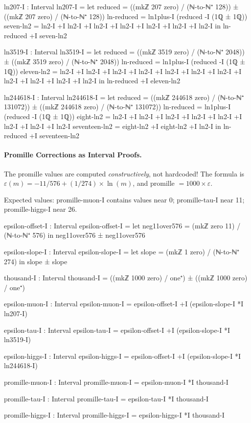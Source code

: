 \documentclass[11pt,a4paper]{book}
\def\texttt#1{#1}%
\begin{document}
\begin{code}
ln207-I : Interval
ln207-I = 
  let reduced = ((mkℤ 207 zero) / (ℕ-to-ℕ⁺ 128)) ± ((mkℤ 207 zero) / (ℕ-to-ℕ⁺ 128))
      ln-reduced = ln1plus-I (reduced -I (1ℚ ± 1ℚ))
      seven-ln2 = ln2-I +I ln2-I +I ln2-I +I ln2-I +I ln2-I +I ln2-I +I ln2-I
  in ln-reduced +I seven-ln2

ln3519-I : Interval
ln3519-I = 
  let reduced = ((mkℤ 3519 zero) / (ℕ-to-ℕ⁺ 2048)) ± ((mkℤ 3519 zero) / (ℕ-to-ℕ⁺ 2048))
      ln-reduced = ln1plus-I (reduced -I (1ℚ ± 1ℚ))
      eleven-ln2 = ln2-I +I ln2-I +I ln2-I +I ln2-I +I ln2-I +I ln2-I +I ln2-I +I ln2-I +I ln2-I +I ln2-I +I ln2-I
  in ln-reduced +I eleven-ln2

ln244618-I : Interval
ln244618-I = 
  let reduced = ((mkℤ 244618 zero) / (ℕ-to-ℕ⁺ 131072)) ± ((mkℤ 244618 zero) / (ℕ-to-ℕ⁺ 131072))
      ln-reduced = ln1plus-I (reduced -I (1ℚ ± 1ℚ))
      eight-ln2 = ln2-I +I ln2-I +I ln2-I +I ln2-I +I ln2-I +I ln2-I +I ln2-I +I ln2-I
      seventeen-ln2 = eight-ln2 +I eight-ln2 +I ln2-I
  in ln-reduced +I seventeen-ln2

\end{code}

\paragraph{Promille Corrections as Interval Proofs.}
The promille values are computed \emph{constructively}, not hardcoded!
The formula is $\varepsilon(m) = -11/576 + (1/274) \times \ln(m)$, and
promille $= 1000 \times \varepsilon$.

Expected values: \texttt{promille-muon-I} contains values near 0;
\texttt{promille-tau-I} near 11; \texttt{promille-higgs-I} near 26.

\begin{code}
epsilon-offset-I : Interval
epsilon-offset-I = 
  let neg11over576 = (mkℤ zero 11) / (ℕ-to-ℕ⁺ 576)
  in neg11over576 ± neg11over576

epsilon-slope-I : Interval  
epsilon-slope-I = 
  let slope = (mkℤ 1 zero) / (ℕ-to-ℕ⁺ 274)
  in slope ± slope

thousand-I : Interval
thousand-I = ((mkℤ 1000 zero) / one⁺) ± ((mkℤ 1000 zero) / one⁺)

epsilon-muon-I : Interval
epsilon-muon-I = epsilon-offset-I +I (epsilon-slope-I *I ln207-I)

epsilon-tau-I : Interval
epsilon-tau-I = epsilon-offset-I +I (epsilon-slope-I *I ln3519-I)

epsilon-higgs-I : Interval
epsilon-higgs-I = epsilon-offset-I +I (epsilon-slope-I *I ln244618-I)

promille-muon-I : Interval
promille-muon-I = epsilon-muon-I *I thousand-I

promille-tau-I : Interval
promille-tau-I = epsilon-tau-I *I thousand-I

promille-higgs-I : Interval
promille-higgs-I = epsilon-higgs-I *I thousand-I

\end{code}
\end{document}
